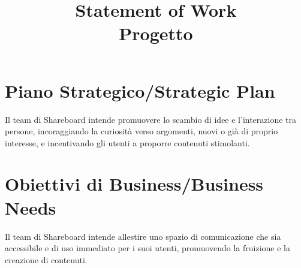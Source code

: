 \documentclass[12pt]{article}
\title{Statement of Work\\Progetto}
\author{\presentatoda}
\begin{document}
\maketitle

\begin{versionhistory}
\end{versionhistory}
\clearpage

\section{Piano Strategico/Strategic Plan}
  Il team di Shareboard intende promuovere lo scambio di idee e l’interazione tra persone, incoraggiando la curiosità verso argomenti, nuovi o già di proprio interesse, e incentivando gli utenti a proporre contenuti stimolanti.
  
  \section{Obiettivi di Business/Business Needs}
  Il team di Shareboard intende allestire uno spazio di comunicazione che sia accessibile e di uso immediato per i suoi utenti, promuovendo la fruizione e la creazione di contenuti.
  
\end{document}
